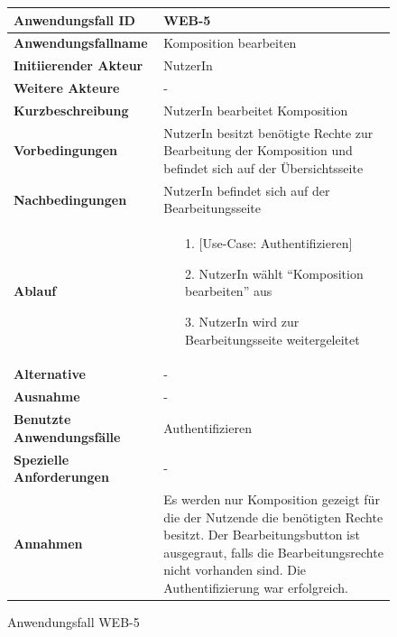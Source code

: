 \begin{figure}[h]
	\centering
	\begin{tabularx}{\textwidth}{ X | X }
		\textbf{Anwendungsfall ID} & WEB-5 \\ \hline
		\textbf{Anwendungsfallname} & Komposition bearbeiten \\ \hline
		\textbf{Initiierender Akteur} & NutzerIn \\ \hline
		\textbf{Weitere Akteure} & - \\ \hline
		\textbf{Kurzbeschreibung} & NutzerIn bearbeitet Komposition \\ \hline
		\textbf{Vorbedingungen} & NutzerIn besitzt benötigte Rechte zur Bearbeitung der Komposition und befindet sich auf der Übersichtsseite \\ \hline
		\textbf{Nachbedingungen} & NutzerIn befindet sich auf der Bearbeitungsseite \\ \hline
		\textbf{Ablauf} &
		\begin{enumerate}
			\item[1.] [Use-Case: Authentifizieren]
			\item[2.] NutzerIn wählt ``Komposition bearbeiten'' aus
			\item[3.] NutzerIn wird zur Bearbeitungsseite weitergeleitet
		\end{enumerate} \\ \hline
		\textbf{Alternative} & - \\ \hline
		\textbf{Ausnahme} & - \\ \hline
		\textbf{Benutzte Anwendungsfälle} & Authentifizieren \\ \hline
		\textbf{Spezielle Anforderungen} & - \\ \hline
		\textbf{Annahmen} & Es werden nur Komposition gezeigt für die der Nutzende die benötigten Rechte besitzt.
                  Der Bearbeitungsbutton ist ausgegraut, falls die Bearbeitungsrechte nicht vorhanden sind. Die Authentifizierung war erfolgreich.
	\end{tabularx}
	\caption{Anwendungsfall WEB-5}
	\label{fig:anwendungsfall-server-tabelle-web-5}
\end{figure}

